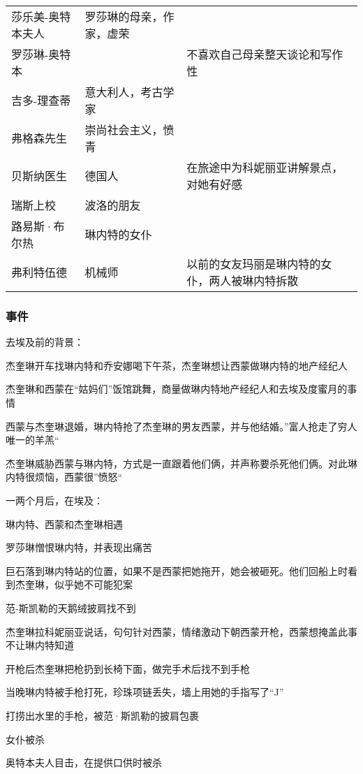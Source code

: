 \begin{longtable}{p{} | p{} | p{}}
莎乐美-奥特本夫人 & 罗莎琳的母亲，作家，虚荣	& \\
罗莎琳-奥特本 & & 不喜欢自己母亲整天谈论和写作性 \\
吉多-理查蒂 & 意大利人，考古学家	& \\
弗格森先生 & 崇尚社会主义，愤青	& \\
贝斯纳医生 & 德国人 & 在旅途中为科妮丽亚讲解景点，对她有好感 \\
瑞斯上校	& 波洛的朋友	& \\
路易斯·布尔热 & 琳内特的女仆	& \\
弗利特伍德	& 机械师 &	以前的女友玛丽是琳内特的女仆，两人被琳内特拆散 \\

\end{longtable}

\subsubsection{事件}
去埃及前的背景：
\begin{itemize*}
    \item 杰奎琳开车找琳内特和乔安娜喝下午茶，杰奎琳想让西蒙做琳内特的地产经纪人
    \item 杰奎琳和西蒙在“姑妈们”饭馆跳舞，商量做琳内特地产经纪人和去埃及度蜜月的事情
    \item 西蒙与杰奎琳退婚，琳内特抢了杰奎琳的男友西蒙，并与他结婚。”富人抢走了穷人唯一的羊羔“
    \item 杰奎琳威胁西蒙与琳内特，方式是一直跟着他们俩，并声称要杀死他们俩。对此琳内特很烦恼，西蒙很”愤怒“
\end{itemize*}

一两个月后，在埃及：
\begin{itemize*}
    \item 琳内特、西蒙和杰奎琳相遇
    \item 罗莎琳憎恨琳内特，并表现出痛苦
    \item 巨石落到琳内特站的位置，如果不是西蒙把她拖开，她会被砸死。他们回船上时看到杰奎琳，似乎她不可能犯案
    \item 范-斯凯勒的天鹅绒披肩找不到
    \item 杰奎琳拉科妮丽亚说话，句句针对西蒙，情绪激动下朝西蒙开枪，西蒙想掩盖此事不让琳内特知道
    \item 开枪后杰奎琳把枪扔到长椅下面，做完手术后找不到手枪
    \item 当晚琳内特被手枪打死，珍珠项链丢失，墙上用她的手指写了“J”
    \item 打捞出水里的手枪，被范·斯凯勒的披肩包裹
    \item 女仆被杀
    \item 奥特本夫人目击，在提供口供时被杀
\end{itemize*}

